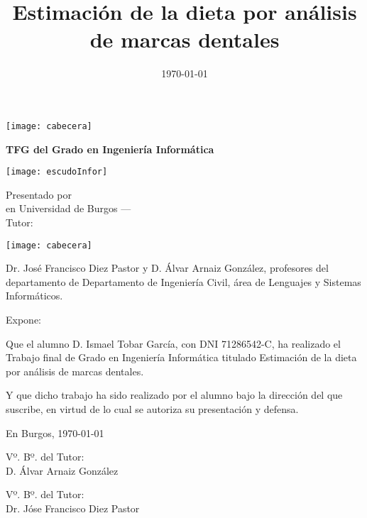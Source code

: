 \documentclass[a4paper,11pt,oneside]{memoir}
\title{Estimación de la dieta por análisis de marcas dentales}
\author{\nombre}
\date{\today}
\makeatletter
\def\maketitle{
  \null
  \thispagestyle{empty}
\noindent\texttt{[image: cabecera]}\vspace{1cm}%
  \vfill
  \colorbox{cpardoBox}{%
    \begin{minipage}{.8\textwidth}
      \vspace{.5cm}\Large
      \begin{center}
      \textbf{TFG del Grado en Ingeniería Informática}\vspace{.6cm}\\
      \textbf{\LARGE\@title{}}
      \end{center}
      \vspace{.2cm}
    \end{minipage}

  }%
  \hfill\begin{minipage}{.20\textwidth}
    \texttt{[image: escudoInfor]}
  \end{minipage}
  \vfill
  \begin{center}%
  {%
    \noindent\LARGE
    Presentado por \@author{}\\ 
    en Universidad de Burgos --- \@date{}\\
    Tutor: \@tutor{}\\
  }%
  \end{center}%
  \null
  \cleardoublepage
  }
\newcommand{\nombre}{Ismael Tobar García} %
\makeatother
\begin{document}
\maketitle



\null\cleardoublepage


\pagestyle{empty}


\noindent\texttt{[image: cabecera]}\vspace{1cm}

\noindent Dr. José Francisco Diez Pastor y D. Álvar Arnaiz González, profesores del departamento de Departamento de Ingeniería Civil, área de Lenguajes y Sistemas Informáticos.
		

\noindent Expone:

\noindent Que el alumno D. \nombre, con DNI 71286542-C, ha realizado el Trabajo final de Grado en Ingeniería Informática titulado Estimación de la dieta por análisis de marcas dentales. 

\noindent Y que dicho trabajo ha sido realizado por el alumno bajo la dirección del que suscribe, en virtud de lo cual se autoriza su presentación y defensa.

\begin{center} %
En Burgos, {\large \today}
\end{center}

\vfill\vfill\vfill

\begin{minipage}{0.45\textwidth}
\begin{flushleft} %
Vº. Bº. del Tutor:\\[2cm]
D. Álvar Arnaiz González
\end{flushleft}
\end{minipage}
\hfill
\begin{minipage}{0.45\textwidth}
\begin{flushleft} %
Vº. Bº. del Tutor:\\[2cm]
Dr. Jóse Francisco Diez Pastor
\end{flushleft}
\end{minipage}
\hfill

\vfill



\null\cleardoublepage
\null\cleardoublepage
\end{document}
